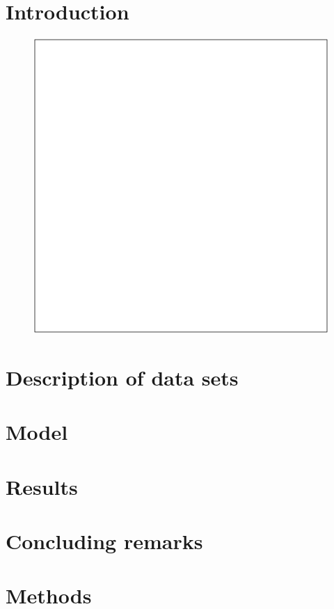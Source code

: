 \section{Introduction}
\label{sec:introduction}


\begin{figure}[tp!]
  \centering	
    \includegraphics[width=\columnwidth]{figures/local/null.pdf}  
  \caption{
  }
  \label{fig:}
\end{figure}

\section{Description of data sets}
\label{sec:data}


\section{Model}
\label{sec:model}

\section{Results}
\label{sec:results}


\section{Concluding remarks}
\label{sec:concludingremarks}


\section{Methods}
\label{sec:methods}

